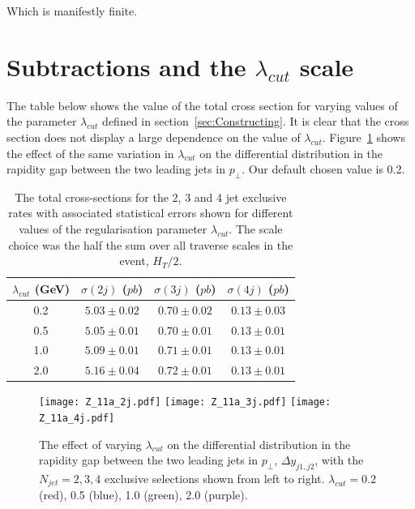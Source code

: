 		Which is manifestly finite.

	\section{Subtractions and the $\lambda_{cut}$ scale}
		\label{sec:indep-lambd}

		The table below shows the value of the total cross section for varying values of
		the parameter $\lambda_{cut}$ defined in section~\ref{sec:Constructing}.  It is
		clear that the cross section does not display a large dependence on the value of $\lambda_{cut}$.
		Figure~\ref{fig:lambdadist} shows the effect of the same variation in $\lambda_{cut}$ on the
		differential distribution in the rapidity gap between the two leading jets in $p_\perp$.
		Our default chosen value is 0.2.

		\begin{table}[htp!]
		\begin{center}
			\begin{tabular}{| c | c | c | c |}
			\hline
			$\lambda_{cut}$ (GeV) & $\sigma(2j)$ ($pb$) & $\sigma(3j)$ ($pb$) & $\sigma(4j)$ ($pb$) \\ \hline
			0.2 & $5.03 \pm 0.02$ & $0.70 \pm 0.02$ & $0.13 \pm 0.03$ \\
			0.5 & $5.05 \pm 0.01$ & $0.70 \pm 0.01$ & $0.13 \pm 0.01$ \\
			1.0 & $5.09 \pm 0.01$ & $0.71 \pm 0.01$ & $0.13 \pm 0.01$ \\
			2.0 & $5.16 \pm 0.04$ & $0.72 \pm 0.01$ & $0.13 \pm 0.01$ \\ \hline
			\end{tabular}
			\caption{The total cross-sections for the 2, 3 and 4 jet exclusive rates with associated
			         statistical errors shown for different values of the regularisation parameter $\lambda_{cut}$.
			         The scale choice was the half the sum over all traverse scales in the event, $H_T/2$.}
		\end{center}
		\end{table}

		\begin{figure}[htp!]
			\centering
			\texttt{[image: Z\_11a\_2j.pdf]}\hfill
			\texttt{[image: Z\_11a\_3j.pdf]}\hfill
			\texttt{[image: Z\_11a\_4j.pdf]}
			\caption{The effect of varying $\lambda_{cut}$ on the differential distribution
			in the rapidity gap between the two leading jets in $p_\perp$, $\Delta y_{j1, j2}$, with the $N_{jet}=2,3,4$
			exclusive selections shown from left to right.  $\lambda_{cut}=0.2$ (red), 0.5 (blue), 1.0 (green), 2.0 (purple).}
			\label{fig:lambdadist}
		\end{figure}

